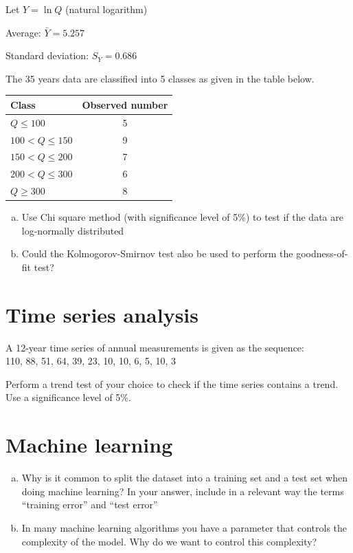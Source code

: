 \documentclass[12pt]{article}
\begin{document}
Let $Y = \ln Q$ (natural logarithm)

Average: $\bar{Y}=5.257$ 

Standard deviation: $S_Y = 0.686$

The 35 years data are classified into 5 classes as given in the table below.
\begin{table}[h!!]
\begin{tabular}{l|c}
Class & Observed number \\
\hline
$Q \le 100$ & 5 \\
$100<Q \le 150$ & 9 \\
$150<Q \le 200$ & 7 \\
$200<Q \le 300$ & 6 \\
$Q \ge 300$ & 8 \\
\hline
\end{tabular}
\end{table}


\begin{enumerate}[(a)] 
\item Use Chi square method (with significance level of 5\%) to test if the data are log-normally distributed
\item Could the Kolmogorov-Smirnov test also be used to perform the goodness-of-fit test?
\end{enumerate}


\section{Time series analysis}
A 12-year time series of annual measurements is given as the sequence:\\
110, 88, 51, 64, 39, 23, 10, 10, 6, 5, 10, 3

Perform a trend test of your choice to check if the time series contains a trend. Use a significance level of 5\%.



\section{Machine learning}
\begin{enumerate}[(a)] 
\item Why is it common to split the dataset into a training set and a test set when doing machine learning? In your answer, include in a relevant way the terms “training error” and “test error”
\item In many machine learning algorithms you have a parameter that controls the complexity of the model. Why do we want to control this complexity?
\end{enumerate}
\end{document}
